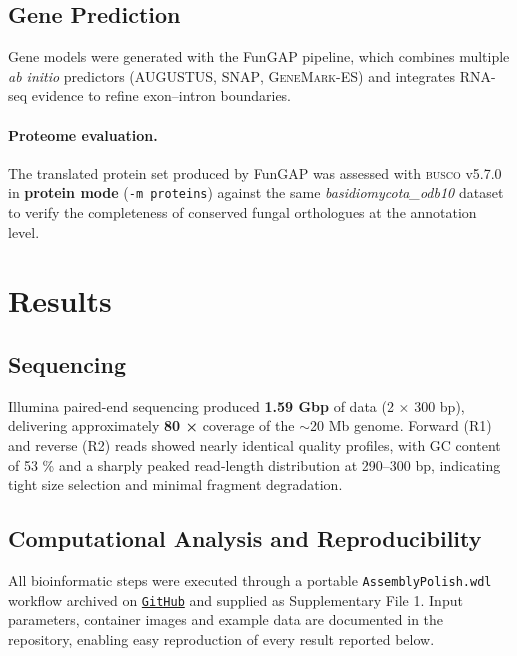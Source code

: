 \documentclass[Journal,letterpaper]{ascelike-new}
\begin{document}
\subsection*{Gene Prediction}

Gene models were generated with the FunGAP pipeline, which combines multiple \textit{ab initio} predictors (\textsc{AUGUSTUS}, \textsc{SNAP}, \textsc{GeneMark-ES}) and integrates RNA-seq evidence to refine exon–intron boundaries.

\paragraph{Proteome evaluation.} The translated protein set produced by FunGAP was assessed with \textsc{busco} v5.7.0 in \textbf{protein mode} (\texttt{-m proteins}) against the same \textit{basidiomycota\_odb10} dataset to verify the completeness of conserved fungal orthologues at the annotation level.

\section*{Results}

\subsection*{Sequencing}

Illumina paired-end sequencing produced \textbf{1.59 Gbp} of data (2 × 300 bp), delivering approximately \textbf{80 ×} coverage of the \(\sim\)20 Mb genome. Forward (R1) and reverse (R2) reads showed nearly identical quality profiles, with GC content of 53 \% and a sharply peaked read-length distribution at 290–300 bp, indicating tight size selection and minimal fragment degradation.

\subsection*{Computational Analysis and Reproducibility}

All bioinformatic steps were executed through a portable \texttt{AssemblyPolish.wdl} workflow archived on \href{https://github.com/lmtani/s-scitamineum-pipelines}{\texttt{GitHub}} and supplied as Supplementary File 1.  Input parameters, container images and example data are documented in the repository, enabling easy reproduction of every result reported below.
\end{document}
